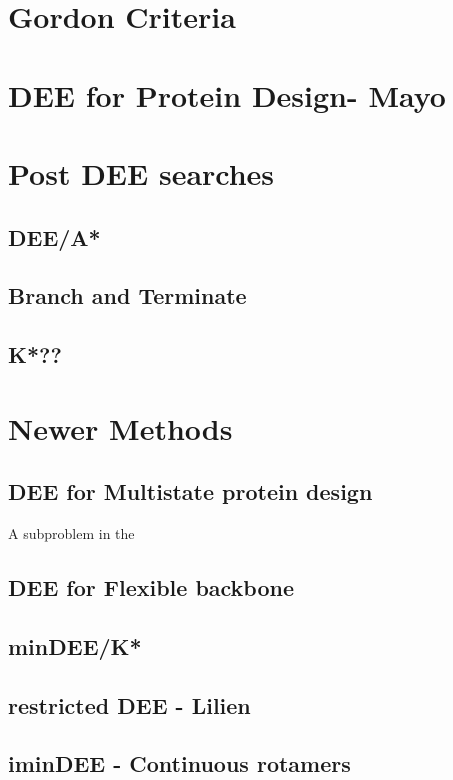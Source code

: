 \documentclass{article}
\begin{document}
\section{Gordon Criteria}

\section{DEE for Protein Design- Mayo}

\section{Post DEE searches}
\subsection{DEE/A*}

\subsection{Branch and Terminate}

\subsection{K*??} 

\section{Newer Methods}

\subsection{DEE for Multistate protein design}
A subproblem in the 

\subsection{DEE for Flexible backbone}

\subsection{minDEE/K*}

\subsection{restricted DEE - Lilien}

\subsection{iminDEE - Continuous rotamers}
\end{document}
